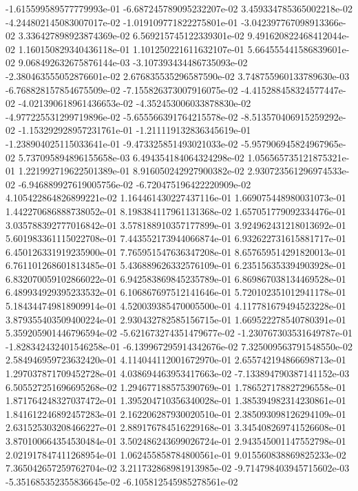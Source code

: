 -1.615599589577779993e-01
-6.687245789095232207e-02
3.459334785365002218e-02
-4.244802145083007017e-02
-1.019109771822275801e-01
-3.042397767098913366e-02
3.336427898923874369e-02
6.569215745122339301e-02
9.491620822468412044e-02
1.160150829340436118e-01
1.101250221611632107e-01
5.664555441586839601e-02
9.068492632675876144e-03
-3.107393434486735093e-02
-2.380463555052876601e-02
2.676835535296587590e-02
3.748755960133789630e-03
-6.768828157854675509e-02
-7.155826373007916075e-02
-4.415288458324577447e-02
-4.021390618961436653e-02
-4.352453006033878830e-02
-4.977225531299719896e-02
-5.655566391764215578e-02
-8.513570406915259292e-02
-1.153292928957231761e-01
-1.211119132836345619e-01
-1.238904025115033641e-01
-9.473325851493021033e-02
-5.957906945824967965e-02
5.737095894896155658e-03
6.494354184064324298e-02
1.056565735121875321e-01
1.221992719622501389e-01
8.916050242927900382e-02
2.930723561296974533e-02
-6.946889927619005756e-02
-6.720475196422220909e-02
4.105422864826899221e-02
1.164461430227437116e-01
1.669075448980031073e-01
1.442270686888738052e-01
8.198384117961131368e-02
1.657051779092334476e-01
3.035788392777016842e-01
3.578188910357177899e-01
3.924962431218013692e-01
5.601983361115022708e-01
7.443552173944066874e-01
6.932622731615881717e-01
6.450126331919235900e-01
7.765951547636347208e-01
8.657659514291820013e-01
6.761101268601813485e-01
5.436889626332576109e-01
6.235156353394903928e-01
6.832070059102866022e-01
6.942583869845235789e-01
6.869867038134469528e-01
6.489934929395233532e-01
6.106867697512141646e-01
5.720102351012941178e-01
5.184344749818909914e-01
4.520039385470005500e-01
4.117781679494523228e-01
3.879355403509400224e-01
2.930432782585156715e-01
1.669522278540780391e-01
5.359205901446796594e-02
-5.621673274351479677e-02
-1.230767303531649787e-01
-1.828342432401546258e-01
-6.139967295914342676e-02
7.325009563791548550e-02
2.584946959723632420e-01
4.114044112001672970e-01
2.655742194866698713e-01
1.297037871709452728e-01
4.038694463953417663e-02
-7.133894790387141152e-03
6.505527251696695268e-02
1.294677188575390769e-01
1.786527178827296558e-01
1.871764248327037472e-01
1.395204710356340028e-01
1.385394982314230861e-01
1.841612246892457283e-01
2.162206287930020510e-01
2.385093098126294109e-01
2.631525303208466227e-01
2.889176784516229168e-01
3.345408269741526608e-01
3.870100664354530484e-01
3.502486243699026724e-01
2.943545001147552798e-01
2.021917847411268954e-01
1.062455858784800561e-01
9.015560838869825233e-02
7.365042657259762704e-02
3.211732868981913985e-02
-9.714798403945715602e-03
-5.351685352355836645e-02
-6.105812545985278561e-02
